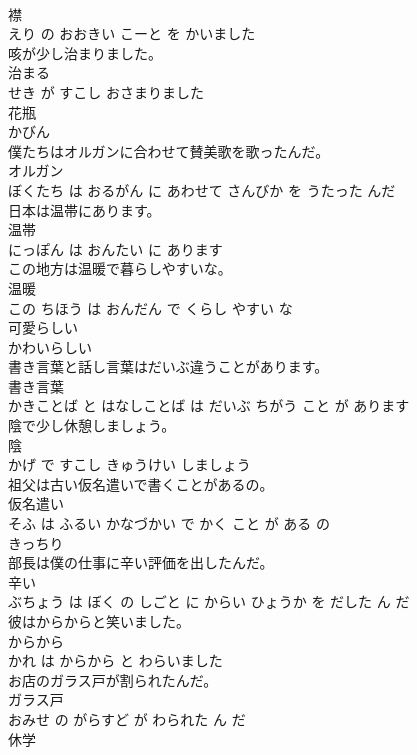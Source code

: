 \documentclass[8pt]{extreport}
\begin{document}
\begin{CJK}{UTF8}{min}
\\	襟 
\\	えり の おおきい こーと を かいました			
\\	咳が少し治まりました。	
\\	治まる 
\\	せき が すこし おさまりました			
\\	花瓶	
\\	かびん		
\\	僕たちはオルガンに合わせて賛美歌を歌ったんだ。	
\\	オルガン 
\\	ぼくたち は おるがん に あわせて さんびか を うたった んだ			
\\	日本は温帯にあります。	
\\	温帯 
\\	にっぽん は おんたい に あります			
\\	この地方は温暖で暮らしやすいな。	
\\	温暖 
\\	この ちほう は おんだん で くらし やすい な			
\\	可愛らしい	
\\	かわいらしい		
\\	書き言葉と話し言葉はだいぶ違うことがあります。	
\\	書き言葉 
\\	かきことば と はなしことば は だいぶ ちがう こと が あります			
\\	陰で少し休憩しましょう。	
\\	陰 
\\	かげ で すこし きゅうけい しましょう			
\\	祖父は古い仮名遣いで書くことがあるの。	
\\	仮名遣い 
\\	そふ は ふるい かなづかい で かく こと が ある の			
\\	きっちり	
\\	部長は僕の仕事に辛い評価を出したんだ。	
\\	辛い 
\\	ぶちょう は ぼく の しごと に からい ひょうか を だした ん だ			
\\	彼はからからと笑いました。	
\\	からから 
\\	かれ は からから と わらいました			
\\	お店のガラス戸が割られたんだ。	
\\	ガラス戸 
\\	おみせ の がらすど が わられた ん だ			
\\	休学	

\end{CJK}
\end{document}
